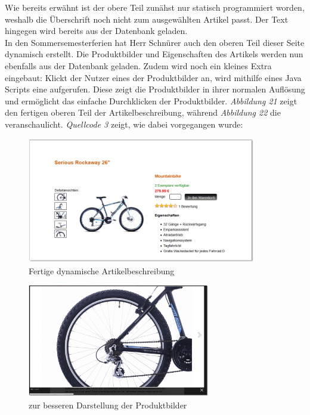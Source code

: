 Wie bereits erwähnt ist der obere Teil zunähst nur statisch programmiert worden, weshalb die Überschrift noch nicht zum ausgewählten Artikel passt. Der Text \grqq{} hingegen wird bereits aus der Datenbank geladen.
\\
In den Sommersemesterferien hat Herr Schnürer auch den oberen Teil dieser Seite dynamisch erstellt. Die Produktbilder und Eigenschaften des Artikels werden nun ebenfalls aus der Datenbank geladen. Zudem wird noch ein kleines Extra eingebaut: Klickt der Nutzer eines der Produktbilder an, wird mithilfe eines Java Scripts eine \grqq{} aufgerufen. Diese zeigt die Produktbilder in ihrer normalen Auflösung und ermöglicht das einfache Durchklicken der Produktbilder. \textit{Abbildung 21} zeigt den fertigen oberen Teil der Artikelbeschreibung, während \textit{Abbildung 22} die \grqq{} veranschaulicht. \textit{Quellcode 3} zeigt, wie dabei vorgegangen wurde:

\begin{figure}[H]
\begin{center}
\includegraphics[width=10cm]{Bilder/Abbildung12-DynamischeDetailierteArtikelbeschreibungFertig.png}
\end{center}
\caption{Fertige dynamische Artikelbeschreibung}
\label{Abbildung12-Fertige dynamische Artikelbeschreibung}
\end{figure}

\begin{figure}[H]
\begin{center}
\includegraphics[width=8cm]{Bilder/Abbildung13-Lightbox.png}
\end{center}
\caption{\grqq{} zur besseren Darstellung der Produktbilder}
\label{Abbildung13-"Lightbox" zur besseren Darstellung der Produktbilder}
\end{figure}



